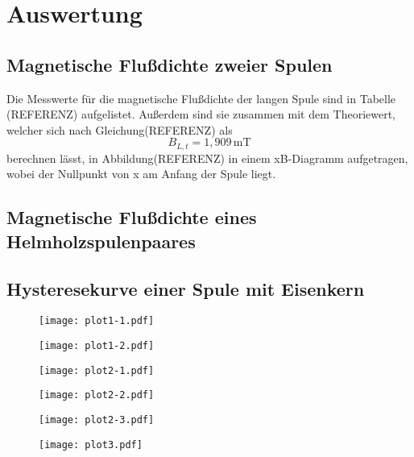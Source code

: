 \section{Auswertung}
\label{sec:Auswertung}
\subsection{Magnetische Flußdichte zweier Spulen}
Die Messwerte für die magnetische Flußdichte der 
langen Spule sind in Tabelle (REFERENZ) aufgelistet.
Außerdem sind sie zusammen mit dem Theoriewert, welcher
sich nach Gleichung(REFERENZ) als
\begin{equation}
  B_{L,t}=1,909\,\si{\milli\tesla}\nonumber
\end{equation}
berechnen lässt, in Abbildung(REFERENZ) in einem
xB-Diagramm aufgetragen, wobei der Nullpunkt
von x am Anfang der Spule liegt. 

\subsection{Magnetische Flußdichte eines Helmholzspulenpaares}
\subsection{Hysteresekurve einer Spule mit Eisenkern}

\begin{table}[H]
  \centering
  \label{tab:messwerte}
\end{table}
\begin{figure}
  \texttt{[image: plot1-1.pdf]}
\end{figure}
\begin{figure}
  \texttt{[image: plot1-2.pdf]}
\end{figure}
\begin{figure}
  \texttt{[image: plot2-1.pdf]}
\end{figure}
\begin{figure}
  \texttt{[image: plot2-2.pdf]}
\end{figure}
\begin{figure}
  \texttt{[image: plot2-3.pdf]}
\end{figure}
\begin{figure}
  \texttt{[image: plot3.pdf]}
\end{figure}



